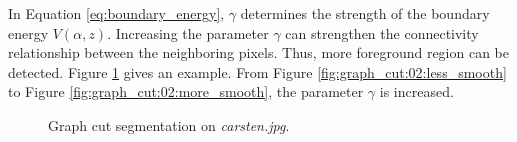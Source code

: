 \documentclass[paper=a4, fontsize=11pt]{scrartcl}
\begin{document}
In Equation \eqref{eq:boundary_energy}, $ \gamma $ determines the strength of the boundary energy $ V(\alpha, z) $.
Increasing the parameter $ \gamma $ can strengthen the connectivity relationship between the neighboring pixels.
Thus, more foreground region can be detected.
Figure \ref{fig:graph_cut:02} gives an example.
From Figure \ref{fig:graph_cut:02:less_smooth} to Figure \ref{fig:graph_cut:02:more_smooth}, the parameter $ \gamma $ is increased.

\begin{figure}[h]
\centering
{}
\caption{Graph cut segmentation on \emph{carsten.jpg}.}
\label{fig:graph_cut:02}
\end{figure}
\end{document}
